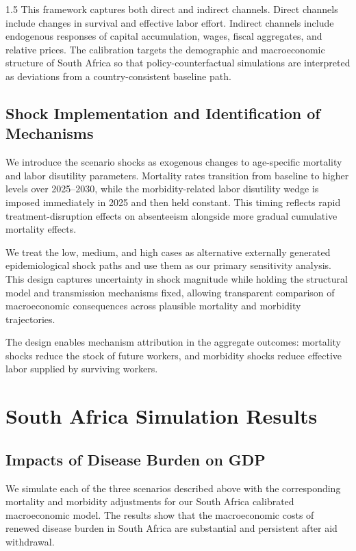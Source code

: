 \documentclass[letterpaper,12pt]{article}
\theoremstyle{definition}
\begin{document}
\begin{spacing}{1.5}
This framework captures both direct and indirect channels. Direct channels include changes in survival and effective labor effort. Indirect channels include endogenous responses of capital accumulation, wages, fiscal aggregates, and relative prices. The calibration targets the demographic and macroeconomic structure of South Africa so that policy-counterfactual simulations are interpreted as deviations from a country-consistent baseline path.


\subsection{Shock Implementation and Identification of Mechanisms}\label{SecShocks}

We introduce the scenario shocks as exogenous changes to age-specific mortality and labor disutility parameters. Mortality rates transition from baseline to higher levels over 2025--2030, while the morbidity-related labor disutility wedge is imposed immediately in 2025 and then held constant. This timing reflects rapid treatment-disruption effects on absenteeism alongside more gradual cumulative mortality effects.

We treat the low, medium, and high cases as alternative externally generated epidemiological shock paths and use them as our primary sensitivity analysis. This design captures uncertainty in shock magnitude while holding the structural model and transmission mechanisms fixed, allowing transparent comparison of macroeconomic consequences across plausible mortality and morbidity trajectories.

The design enables mechanism attribution in the aggregate outcomes: mortality shocks reduce the stock of future workers, and morbidity shocks reduce effective labor supplied by surviving workers.


\section{South Africa Simulation Results}\label{SecResults}


\subsection{Impacts of Disease Burden on GDP}

We simulate each of the three scenarios described above with the corresponding mortality and morbidity adjustments for our South Africa calibrated macroeconomic model. The results show that the macroeconomic costs of renewed disease burden in South Africa are substantial and persistent after aid withdrawal.


\end{spacing}
\end{document}
